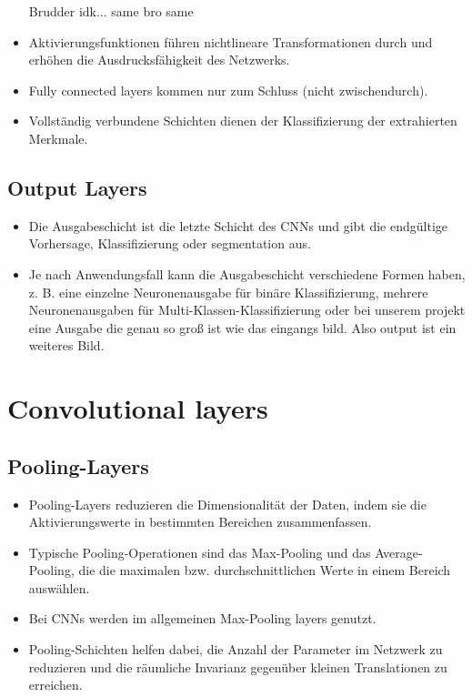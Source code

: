 \begin{itemize}
Brudder idk...
same bro same


  
  \item Aktivierungsfunktionen führen nichtlineare Transformationen durch und erhöhen die Ausdrucksfähigkeit des Netzwerks.
  \item Fully connected layers kommen nur zum Schluss (nicht zwischendurch).
  \item Vollständig verbundene Schichten dienen der Klassifizierung der extrahierten Merkmale.
\end{itemize}

\subsection{Output Layers}
\begin{itemize}
  \item Die Ausgabeschicht ist die letzte Schicht des CNNs und gibt die endgültige Vorhersage, Klassifizierung oder segmentation aus.
  \item Je nach Anwendungsfall kann die Ausgabeschicht verschiedene Formen haben, z. B. eine einzelne Neuronenausgabe für binäre Klassifizierung, mehrere Neuronenausgaben für Multi-Klassen-Klassifizierung oder bei unserem projekt eine Ausgabe die genau so groß ist wie das eingangs bild. Also output ist ein weiteres Bild.
\end{itemize}

\section{Convolutional layers}

\subsection{Pooling-Layers}
\begin{itemize}
  \item Pooling-Layers reduzieren die Dimensionalität der Daten, indem sie die Aktivierungswerte in bestimmten Bereichen zusammenfassen.
  \item Typische Pooling-Operationen sind das Max-Pooling und das Average-Pooling, die die maximalen bzw. durchschnittlichen Werte in einem Bereich auswählen.
  \item Bei CNNs werden im allgemeinen Max-Pooling layers genutzt.
  \item Pooling-Schichten helfen dabei, die Anzahl der Parameter im Netzwerk zu reduzieren und die räumliche Invarianz gegenüber kleinen Translationen zu erreichen.
\end{itemize}

